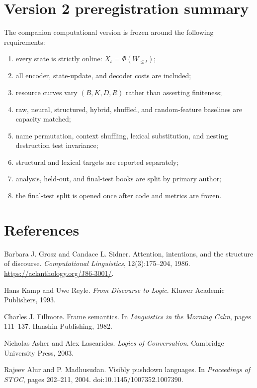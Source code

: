 \documentclass[11pt]{article}
\begin{document}
\section{Version 2 preregistration summary}\label{version-2-preregistration-summary}

The companion computational version is frozen around the following requirements:

\begin{enumerate}
\def\labelenumi{\arabic{enumi}.}
\item
  every state is strictly online: \(X_t=\Phi(W_{\leq t})\);
\item
  all encoder, state-update, and decoder costs are included;
\item
  resource curves vary \((B,K,D,R)\) rather than asserting finiteness;
\item
  raw, neural, structured, hybrid, shuffled, and random-feature baselines are capacity matched;
\item
  name permutation, context shuffling, lexical substitution, and nesting destruction test invariance;
\item
  structural and lexical targets are reported separately;
\item
  analysis, held-out, and final-test books are split by primary author;
\item
  the final-test split is opened once after code and metrics are frozen.
\end{enumerate}


\section*{References}
Barbara J. Grosz and Candace L. Sidner. Attention, intentions, and the structure of discourse. \emph{Computational Linguistics}, 12(3):175--204, 1986. \url{https://aclanthology.org/J86-3001/}.

Hans Kamp and Uwe Reyle. \emph{From Discourse to Logic}. Kluwer Academic Publishers, 1993.

Charles J. Fillmore. Frame semantics. In \emph{Linguistics in the Morning Calm}, pages 111--137. Hanshin Publishing, 1982.

Nicholas Asher and Alex Lascarides. \emph{Logics of Conversation}. Cambridge University Press, 2003.

Rajeev Alur and P. Madhusudan. Visibly pushdown languages. In \emph{Proceedings of STOC}, pages 202--211, 2004. doi:10.1145/1007352.1007390.
\end{document}
